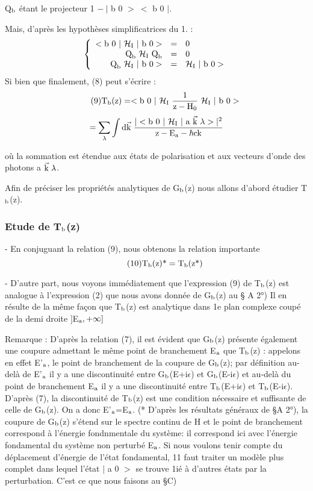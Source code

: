 Q$_{\text{b}}$ étant le projecteur 1 $-\ |$ b 0 $>\ <$ b 0 $|$.

Mais, d'après les hypothèses simplificatrices du 1. :
\[
   \left \{
   \begin{array}{r c l}
< \text{b 0 } |\ \mathcal{H}_{\text{I}}\ |\text{ b 0}>  & = & 0 \\
\text{Q}_{\text{b}}\ \mathcal{H}_{\text{I}}\ \text{Q}_{\text{b}} & = & 0 \\
\text{Q}_{\text{b}}\ \mathcal{H}_{\text{I}}\ |\text{ b 0}> & = & \mathcal{H}_{\text{I}}\ |\text{ b 0}>
   \end{array}
   \right .
\]
Si bien que finalement, (8) peut s'écrire :
\[
\tag{9} \mt{T}_\mt{b}\mt{(z)} =
< \mt{b 0 } |\ \mc{H}_\mt{I}\ \frac{1}{\mt{z}-\mt{H}_0}\ \mc{H}_\mt{I}\ |\mt{ b 0}>
\]
\[
=\sum_\lambda\int\mt{d}\vec{\mt{k}}\ 
\frac{|<\mt{b }0\ |\ \mc{H}_\mt{I}\ |\mt{ a }\vec{\mt{k}}\ \lambda> |^2}
{\mt{z}-\mt{E}_\mt{a}-\hbar\mt{ck}}
\]

où la sommation est étendue aux états de polarisation et aux vecteurs d'onde
des photons a $\vec{\mt{k}}\ \lambda$.

Afin de préciser les propriétés analytiques de G$_{\text{b}}$(z) nous allons
d'abord étudier T$_{\text{b}}$(z).

\subsubsection{Etude de T$_{\text{b}}$(z)}%

- En conjuguant la relation (9), nous obtenons la relation
importante
\[
\tag{10} \text{T}_{\text{b}}(\text{z})\text{*}=\text{T}_{\text{b}}(\text{z*})
\]

- D'autre part, nous voyons immédiatement que l'expression
(9) de T$_{\text{b}}$(z) est analogue à l'expression (2) que nous avons donnée de G$_{\text{b}}$(z) au \S
 A 2°) Il en résulte de la même façon que T$_{\text{b}}$(z) est analytique dans 1e plan
complexe coupé de la demi droite $]$E$_{\text{a}}, +\infty ]$

Remarque : D'après la relation (7), il est évident que G$_{\text{b}}$(z) présente également
une coupure admettant le même point de branchement E$_{\text{a}}$ que T$_{\text{b}}$(z) : appelons
en effet E'$_{\text{a}}$, le point de branchement de la coupure de G$_{\text{b}}$(z); par définition
au-delà de E'$_{\text{a}}$ il y a une discontinuité entre G$_{\text{b}}$(E+i$\epsilon$) et G$_{\text{b}}$(E-i$\epsilon$) et
au-delà du point de branchement E$_{\text{a}}$ il y a une discontinuité entre
T$_{\text{b}}$(E+i$\epsilon$) et T$_{\text{b}}$(E-i$\epsilon$). D'après (7), la discontinuité de T$_{\text{b}}$(z) est une
condition nécessaire et suffisante de celle de G$_{\text{b}}$(z). On a donc
E'$_{\text{a}}$=E$_{\text{a}}$. (* D'après les résultats généraux de \S A 2°), la coupure de G$_{\text{b}}$(z) s'étend sur le
spectre continu de H et le point de branchement correspond à l'énergie fondnmentale du système: il correspond ici avec l'énergie fondamental du système non
perturbé E$_{\text{a}}$. Si nous voulons tenir compte du déplacement d'énergie de l'état fondamental, 11 faut traiter un modèle plus complet dans lequel l'état $|$ a 0 $>$ se
trouve 1ié à d'autres états par la perturbation. C'est ce que nous faisons au \S C)

